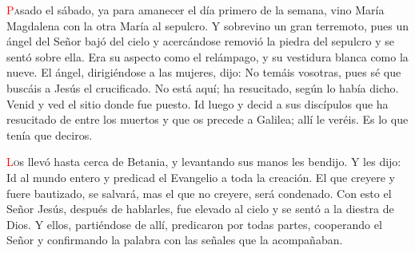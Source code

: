 \documentclass[10pt,twoside]{book}
\begin{document}
\vspace{0.5em}

{}

\vspace{0.5em}

\iralfinal

\vspace{1.5em}

\noindent{}

\vspace{4mm}

\noindent{}
\lettrine[lines=2]{\textcolor{red}{P}}asado el sábado, ya para amanecer el día primero de la semana, vino María Magdalena con la otra María al sepulcro. Y sobrevino un gran terremoto,
pues un ángel del Señor bajó del cielo y acercándose removió la piedra del sepulcro y se sentó sobre ella. Era su aspecto como el relámpago, y su vestidura blanca como la nueve.
El ángel, dirigiéndose a las mujeres, dijo: No temáis vosotras, pues sé que buscáis a Jesús el crucificado. No está aquí; ha resucitado, según lo había dicho.
Venid y ved el sitio donde fue puesto. Id luego y decid a sus discípulos que ha resucitado de entre los muertos y que os precede a Galilea; allí le veréis.
Es lo que tenía que deciros.

\vspace{0.5em}



\vspace{1.5em}

\noindent{}
\lettrine[lines=2]{\textcolor{red}{L}}os llevó hasta cerca de Betania, y levantando sus manos les bendijo. Y les dijo: Id al mundo entero y predicad el Evangelio a toda la creación.
El que creyere y fuere bautizado, se salvará, mas el que no creyere, será condenado. Con esto el Señor Jesús, después de hablarles, fue elevado al cielo y se sentó a la diestra de Dios.
Y ellos, partiéndose de allí, predicaron por todas partes, cooperando el Señor y confirmando la palabra con las señales que la acompañaban.
\end{document}
